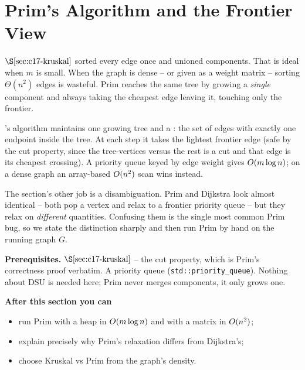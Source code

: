 \section{Prim's Algorithm and the Frontier View}\label{sec:c17-prim}

\begin{previouslybox}
\(\secref{c17-kruskal}\) sorted every edge once and unioned components.  That is
ideal when \(m\) is small.  When the graph is dense -- or given as a weight
matrix -- sorting \(\Theta(n^2)\) edges is wasteful.  Prim reaches the same tree
by growing a \emph{single} component and always taking the cheapest edge leaving
it, touching only the frontier.
\end{previouslybox}

\begin{topicintro}
's algorithm maintains one growing tree and a : the set
of edges with exactly one endpoint inside the tree.  At each step it takes the
lightest frontier edge (safe by the cut property, since the tree-vertices versus
the rest is a cut and that edge is its cheapest crossing).  A priority queue keyed
by edge weight gives \(O(m\log n)\); on a dense graph an array-based
\(O(n^2)\) scan wins instead.

The section's other job is a disambiguation.  Prim and Dijkstra look almost
identical -- both pop a vertex and relax to a frontier priority queue -- but they
relax on \emph{different} quantities.  Confusing them is the single most common
Prim bug, so we state the distinction sharply and then run Prim by hand on the
running graph \(G\).

\textbf{Prerequisites.} \(\secref{c17-kruskal}\) -- the cut property, which is
Prim's correctness proof verbatim.  A priority queue
(\texttt{std::priority\_queue}).  Nothing
about DSU is needed here; Prim never merges components, it only grows one.

\textbf{After this section you can}
\begin{itemize}[nosep]
  \item run Prim with a heap in \(O(m\log n)\) and with a matrix in \(O(n^2)\); \hfill{}
  \item explain precisely why Prim's relaxation differs from Dijkstra's; \hfill{}
  \item choose Kruskal vs Prim from the graph's density. \hfill{}
\end{itemize}
\end{topicintro}

